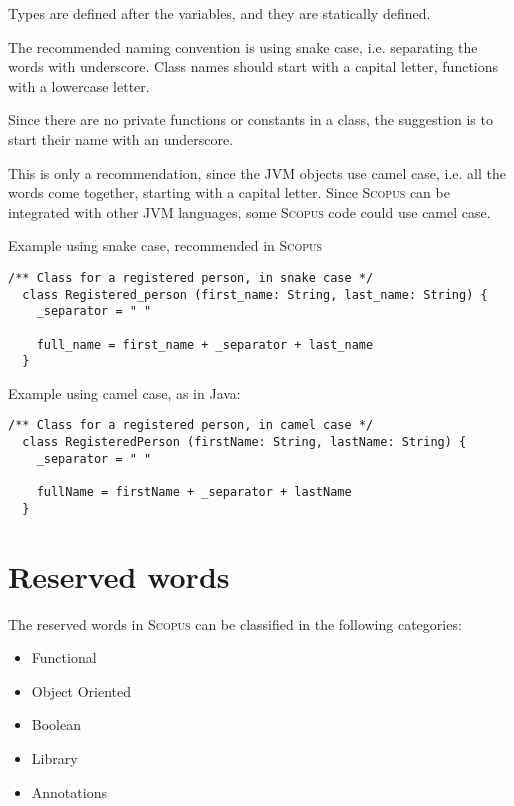 \documentclass[12pt,a4paper]{book}
\newcommand{\Scopus}{\textsc{Scopus}\xspace}
\begin{document}
    Types are defined after the variables, and they are statically defined.

    The recommended naming convention is using snake case, i.e. separating the words with underscore.
    Class names should start with a capital letter, functions with a lowercase letter.

    Since there are no private functions or constants in a class, the suggestion is to start their name with an underscore.

    This is only a recommendation, since the JVM objects use camel case, i.e. all the words come together, starting with a capital letter.
    Since \Scopus can be integrated with other JVM languages, some \Scopus code could use camel case.

    Example using snake case, recommended in \Scopus

    \begin{lstlisting}[label={lst:exampleExtendsSnakeCase}]
  /** Class for a registered person, in snake case */
  class Registered_person (first_name: String, last_name: String) {
    _separator = " "

    full_name = first_name + _separator + last_name
  }
    \end{lstlisting}

    Example using camel case, as in Java:
    \begin{lstlisting}[label={lst:exampleExtendsCamelCase}]
  /** Class for a registered person, in camel case */
  class RegisteredPerson (firstName: String, lastName: String) {
    _separator = " "

    fullName = firstName + _separator + lastName
  }
    \end{lstlisting}


    \chapter{Reserved words}

    The reserved words in \Scopus can be classified in the following categories:

    \begin{itemize}
        \item Functional
        \item Object Oriented
        \item Boolean
        \item Library
        \item Annotations
    \end{itemize}
\end{document}
